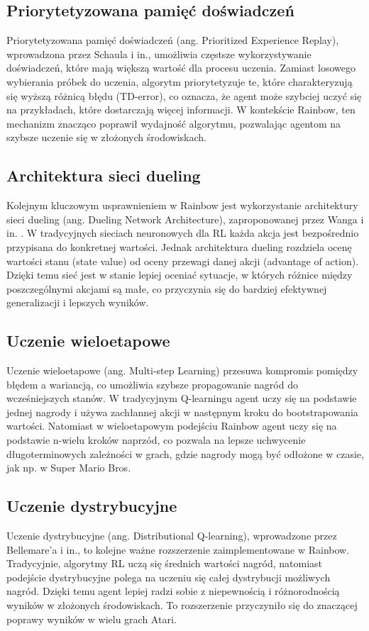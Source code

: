 \subsection{Priorytetyzowana pamięć doświadczeń}
Priorytetyzowana pamięć doświadczeń (ang. Prioritized Experience Replay), wprowadzona przez Schaula i in., umożliwia częstsze wykorzystywanie doświadczeń, które mają większą wartość dla procesu uczenia. Zamiast losowego wybierania próbek do uczenia, algorytm priorytetyzuje te, które charakteryzują się wyższą różnicą błędu (TD-error), co oznacza, że agent może szybciej uczyć się na przykładach, które dostarczają więcej informacji. W kontekście Rainbow, ten mechanizm znacząco poprawił wydajność algorytmu, pozwalając agentom na szybsze uczenie się w złożonych środowiskach.

\subsection{Architektura sieci dueling}
Kolejnym kluczowym usprawnieniem w Rainbow jest wykorzystanie architektury sieci dueling (ang. Dueling Network Architecture), zaproponowanej przez Wanga i in. \cite{RAI}. W tradycyjnych sieciach neuronowych dla RL każda akcja jest bezpośrednio przypisana do konkretnej wartości. Jednak architektura dueling rozdziela ocenę wartości stanu (state value) od oceny przewagi danej akcji (advantage of action). Dzięki temu sieć jest w stanie lepiej oceniać sytuacje, w których różnice między poszczególnymi akcjami są małe, co przyczynia się do bardziej efektywnej generalizacji i lepszych wyników.

\subsection{Uczenie wieloetapowe}
Uczenie wieloetapowe (ang. Multi-step Learning) przesuwa kompromis pomiędzy błędem a wariancją, co umożliwia szybsze propagowanie nagród do wcześniejszych stanów. W tradycyjnym Q-learningu agent uczy się na podstawie jednej nagrody i używa zachłannej akcji w następnym kroku do bootstrapowania wartości. Natomiast w wieloetapowym podejściu Rainbow agent uczy się na podstawie n-wielu kroków naprzód, co pozwala na lepsze uchwycenie długoterminowych zależności w grach, gdzie nagrody mogą być odłożone w czasie, jak np. w Super Mario Bros.

\subsection{Uczenie dystrybucyjne}
Uczenie dystrybucyjne (ang. Distributional Q-learning), wprowadzone przez Bellemare'a i in., to kolejne ważne rozszerzenie zaimplementowane w Rainbow. Tradycyjnie, algorytmy RL uczą się średnich wartości nagród, natomiast podejście dystrybucyjne polega na uczeniu się całej dystrybucji możliwych nagród. Dzięki temu agent lepiej radzi sobie z niepewnością i różnorodnością wyników w złożonych środowiskach. To rozszerzenie przyczyniło się do znaczącej poprawy wyników w wielu grach Atari.

